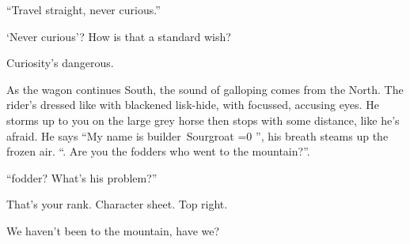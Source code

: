 \begin{multicols}{2}
\begin{description}
  ``Travel straight, never curious.''
  \item[Player 2:]
  `Never curious'?
  How is that a standard wish?
  \item[Player 1:]
  Curiosity's dangerous.
  \item[\Glsentrytext{gm}:]
  As the wagon continues South, the sound of galloping comes from the North.
  The rider's dressed like  with blackened lisk-hide, with focussed, accusing eyes.
  He storms up to you on the large grey horse then stops with some distance, like he's afraid.
  He says ``My name is \Gls{builder}~Sourgroat%
  \ifnum\value{temperature}=0 '', his breath steams up the frozen air.
  ``\else.\fi
  Are you the \glspl{fodder} who went to the mountain?''.
  \item[Player 2:]
  ``\Gls{fodder}?
  What's his problem?''
  \item[Player 1:]
  That's your rank.
  Character sheet.
  Top right.

  We haven't been to the mountain, have we?


\end{description}
\end{multicols}
